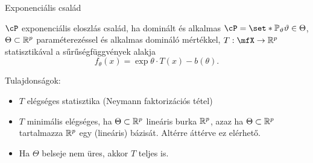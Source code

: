 \documentclass[aspectratio=169,notheorems,9pt,\option]{beamer}
\begin{document}
\begin{frame}{Exponenciális család}
  \begin{df}
    $\cP$ exponenciális eloszlás család, ha dominált és alkalmas 
    $\cP=\set*{\P[\theta]}{\theta\in\Theta}$, $\Theta\subset\mathbb{R}^p$ paraméterezéssel 
    és alkalmas domináló mértékkel, $T:\mfX\to\real^p$ statisztikával 
    a sűrűségfüggvények alakja 
    \begin{displaymath}
      f_{\theta} (x) =\exp{\theta\cdot T(x)-b (\theta)}.\tag{*}
    \end{displaymath}
  \end{df}
  \continue
  Tulajdonságok:
  \begin{itemize}
  \item $T$ elégséges statisztika (Neymann faktorizációs tétel)
  \item $T$ minimális elégséges, ha $\Theta\subset\mathbb{R}^p$ lineáris burka $\mathbb{R}^p$, 
  azaz ha $\Theta\subset\mathbb{R}^p$ tartalmazza $\mathbb{R}^p$ egy (lineáris) bázisát. 
  Altérre áttérve ez elérhető.
  

  \item Ha $\Theta$ belseje nem üres, akkor $T$ teljes is.
  
  \end{itemize}
\end{frame}
\end{document}

